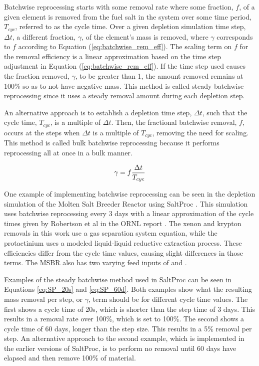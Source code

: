 Batchwise reprocessing starts with some removal rate where some fraction, $f$, of a given element is removed from the fuel salt in the system over some time period, $T_{cyc}$, referred to as the cycle time. Over a given depletion simulation time step, $\Delta t$, a different fraction, $\gamma$, of the element's mass is removed, where $\gamma$ corresponds to $f$ according to Equation (\ref{eq:batchwise_rem_eff}). The scaling term on $f$ for the removal efficiency is a linear approximation based on the time step adjustment in Equation (\ref{eq:batchwise_rem_eff}). If the time step used causes the fraction removed, $\gamma$, to be greater than 1, the amount removed remains at 100\% so as to not have negative mass. This method is called steady batchwise reprocessing since it uses a steady removal amount during each depletion step.

An alternative approach is to establish a depletion time step, $\Delta t$, such that the cycle time, $T_{cyc}$, is a multiple of $\Delta t$. Then, the fractional batchwise removal, $f$, occurs at the steps when $\Delta t$ is a multiple of $T_{cyc}$, removing the need for scaling. This method is called bulk batchwise reprocessing because it performs reprocessing all at once in a bulk manner.

\begin{equation} \hfill
\gamma = f \frac{\Delta t}{T_{cyc}}
\hfill\label{eq:batchwise_rem_eff} \end{equation}

One example of implementing batchwise reprocessing can be seen in the depletion simulation of the Molten Salt Breeder Reactor using SaltProc \cite{rykhlevskii_modeling_2019}. This simulation uses batchwise reprocessing every 3 days with a linear approximation of the cycle times given by Robertson et al in the ORNL report \cite{robertson_conceptual_1971, rykhlevskii_modeling_2019}. The xenon and krypton removals in this work use a gas separation system equation, while the protactinium uses a modeled liquid-liquid reductive extraction process. These efficiencies differ from the cycle time values, causing slight differences in those terms. The MSBR also has two varying feed inputs of  and .

Examples of the steady batchwise method used in SaltProc can be seen in Equations \eqref{eq:SP_20s} and \eqref{eq:SP_60d}. Both examples show what the resulting mass removal per step, or $\gamma$, term should be for different cycle time values. The first shows a cycle time of 20s, which is shorter than the step time of 3 days. This results in a removal rate over 100\%, which is set to 100\%. The second shows a cycle time of 60 days, longer than the step size. This results in a 5\% removal per step. An alternative approach to the second example, which is implemented in the earlier versions of SaltProc, is to perform no removal until 60 days have elapsed and then remove 100\% of material.


